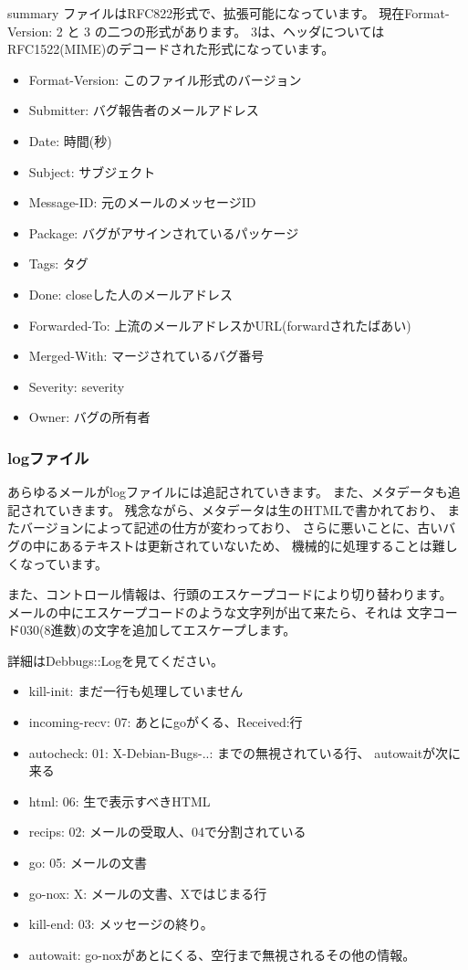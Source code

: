 \documentclass[mingoth,a4paper]{jsarticle}
\begin{document}
summary ファイルはRFC822形式で、拡張可能になっています。
現在Format-Version: 2 と 3 の二つの形式があります。
3は、ヘッダについてはRFC1522(MIME)のデコードされた形式になっています。

\begin{itemize}
 \item Format-Version: このファイル形式のバージョン
 \item Submitter: バグ報告者のメールアドレス
 \item Date: 時間(秒)
 \item Subject: サブジェクト
 \item Message-ID: 元のメールのメッセージID
 \item Package: バグがアサインされているパッケージ
 \item Tags: タグ
 \item Done: closeした人のメールアドレス
 \item Forwarded-To: 上流のメールアドレスかURL(forwardされたばあい)
 \item Merged-With: マージされているバグ番号
 \item Severity: severity
 \item Owner: バグの所有者
\end{itemize}

\subsubsection{logファイル}

あらゆるメールがlogファイルには追記されていきます。
また、メタデータも追記されていきます。
残念ながら、メタデータは生のHTMLで書かれており、
またバージョンによって記述の仕方が変わっており、
さらに悪いことに、古いバグの中にあるテキストは更新されていないため、
機械的に処理することは難しくなっています。

また、コントロール情報は、行頭のエスケープコードにより切り替わります。
メールの中にエスケープコードのような文字列が出て来たら、それは
文字コード030(8進数)の文字を追加してエスケープします。

詳細はDebbugs::Logを見てください。

\begin{itemize}
 \item kill-init: まだ一行も処理していません
 \item incoming-recv: 07: あとにgoがくる、Received:行
 \item autocheck: 01: X-Debian-Bugs-..: までの無視されている行、
       autowaitが次に来る
 \item html: 06: 生で表示すべきHTML
 \item recips: 02: メールの受取人、04で分割されている
 \item go: 05: メールの文書
 \item go-nox: X: メールの文書、Xではじまる行
 \item kill-end: 03: メッセージの終り。
 \item autowait: go-noxがあとにくる、空行まで無視されるその他の情報。
\end{itemize}
\end{document}
